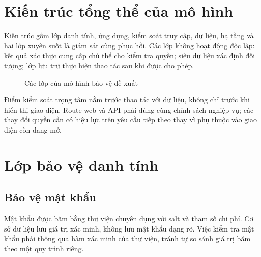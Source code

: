 \section{Kiến trúc tổng thể của mô hình}
Kiến trúc gồm lớp danh tính, ứng dụng, kiểm soát truy cập, dữ liệu, hạ tầng và hai lớp xuyên suốt là giám sát cùng phục hồi. Các lớp không hoạt động độc lập: kết quả xác thực cung cấp chủ thể cho kiểm tra quyền; siêu dữ liệu xác định đối tượng; lớp lưu trữ thực hiện thao tác sau khi được cho phép.
\begin{figure}[htbp]\centering
{}
\caption{Các lớp của mô hình bảo vệ đề xuất}
\end{figure}
Điểm kiểm soát trọng tâm nằm trước thao tác với dữ liệu, không chỉ trước khi hiển thị giao diện. Route web và API phải dùng cùng chính sách nghiệp vụ; các thay đổi quyền cần có hiệu lực trên yêu cầu tiếp theo thay vì phụ thuộc vào giao diện còn đang mở.

\section{Lớp bảo vệ danh tính}
\subsection{Bảo vệ mật khẩu}
Mật khẩu được băm bằng thư viện chuyên dụng với salt và tham số chi phí. Cơ sở dữ liệu lưu giá trị xác minh, không lưu mật khẩu dạng rõ. Việc kiểm tra mật khẩu phải thông qua hàm xác minh của thư viện, tránh tự so sánh giá trị băm theo một quy trình riêng.

